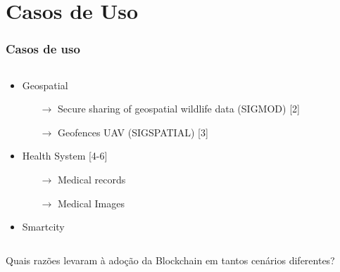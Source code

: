 \section{Casos de Uso}

\begin{frame}
    \frametitle{Casos de uso}
    \begin{columns}[T]
    \begin{column}{0.7\textwidth}
    \begin{itemize}
     \item Geospatial
            \begin{itemize}
                \item [$\rightarrow$] Secure sharing of geospatial wildlife data (SIGMOD) [2]
                \item [$\rightarrow$] Geofences UAV (SIGSPATIAL) [3]
            \end{itemize}
            \item Health System [4-6]
            \begin{itemize}
              \item [$\rightarrow$] Medical records
              \item [$\rightarrow$] Medical Images
            \end{itemize}
            \item Smartcity
    \end{itemize}
    \end{column}
      \begin{column}{0.25\textwidth}
        \end{column}
    \end{columns}
\end{frame}


\begin{frame}
    \begin{center}
           \Large Quais razões levaram à adoção da Blockchain em tantos cenários diferentes?
       \end{center}
\end{frame}
    